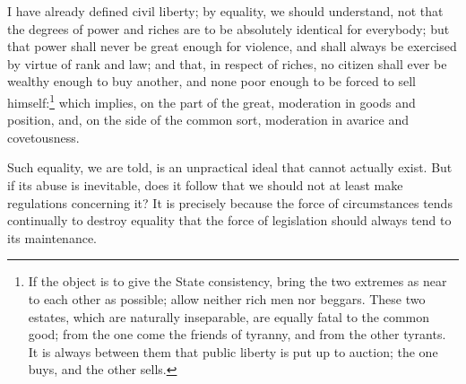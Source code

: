 \documentclass[12pt]{report}
\begin{document}
I have already defined civil liberty; by equality, we should understand, not that the degrees of power and riches are to be absolutely identical for everybody; but that power shall never be great enough for violence, and shall always be exercised by virtue of rank and law; and that, in respect of riches, no citizen shall ever be wealthy enough to buy another, and none poor enough to be forced to sell himself:\footnote{ If the object is to give the State consistency, bring the two extremes as near to each other as possible; allow neither rich men nor beggars. These two estates, which are naturally inseparable, are equally fatal to the common good; from the one come the friends of tyranny, and from the other tyrants. It is always between them that public liberty is put up to auction; the one buys, and the other sells.} which implies, on the part of the great, moderation in goods and position, and, on the side of the common sort, moderation in avarice and covetousness.

Such equality, we are told, is an unpractical ideal that cannot actually exist. But if its abuse is inevitable, does it follow that we should not at least make regulations concerning it? It is precisely because the force of circumstances tends continually to destroy equality that the force of legislation should always tend to its maintenance.
\end{document}
